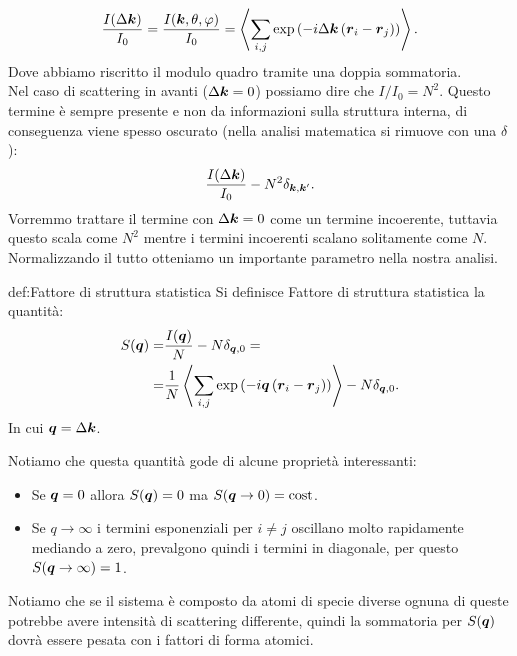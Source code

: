 \[
	\frac{I(\Delta\boldsymbol{k})}{I_0} 
	=
	\frac{I(\boldsymbol{k},\theta,\varphi)}{I_0}
	=
	\left< \sum_{i,j}^{} \exp\left( -i \Delta\boldsymbol{k}\left( \boldsymbol{r}_i - \boldsymbol{r}_j \right)  \right)  \right>
.\] 
Dove abbiamo riscritto il modulo quadro tramite una doppia sommatoria.\\
Nel caso di scattering in avanti ($\Delta\boldsymbol{k}=0$) possiamo dire che $I/I_0 = N^2$. Questo termine è sempre presente e non da informazioni sulla struttura interna, di conseguenza viene spesso oscurato (nella analisi matematica si rimuove con una $\delta$):
\[
	\frac{I(\Delta\boldsymbol{k})}{I_0}-N^2\delta_{\boldsymbol{k},\boldsymbol{k}'}
.\] 
Vorremmo trattare il termine con $\Delta\boldsymbol{k}=0$ come un termine incoerente, tuttavia questo scala come $N^2$ mentre i termini incoerenti scalano solitamente come $N$. Normalizzando il tutto otteniamo un importante parametro nella nostra analisi.
\begin{defn}{def:Fattore di struttura statistica}
	Si definisce Fattore di struttura statistica la quantità: 
	\[\begin{aligned}
		S(\boldsymbol{q}) 
		=&
		\frac{I(\boldsymbol{q})}{N} - N \delta_{\boldsymbol{q},0} 
		=\\=&
		\frac{1}{N}\left< \sum_{i,j}^{} \exp\left( -i \boldsymbol{q}\left( \boldsymbol{r}_i-\boldsymbol{r}_j \right) \right) \right> - N\delta_{\boldsymbol{q},0}
	.\end{aligned}\]
	In cui $\boldsymbol{q}=\Delta\boldsymbol{k}$.
\end{defn}
Notiamo che questa quantità gode di alcune proprietà interessanti:
\begin{itemize}
	\item Se $\boldsymbol{q}=0$ allora $S(\boldsymbol{q})=0$ ma $S(\boldsymbol{q}\to 0) = \text{cost}$.
	\item Se $q\to \infty$ i termini esponenziali per $i\neq j$ oscillano molto rapidamente mediando a zero, prevalgono quindi i termini in diagonale, per questo 
		$S(\boldsymbol{q}\to \infty)=1$.
\end{itemize}
Notiamo che se il sistema è composto da atomi di specie diverse ognuna di queste potrebbe avere intensità di scattering differente, quindi la sommatoria per $S(\boldsymbol{q})$ dovrà essere pesata con i fattori di forma atomici.
